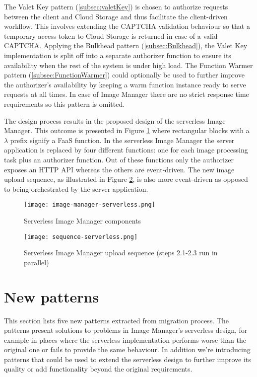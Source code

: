 The Valet Key pattern (\ref{subsec:valetKey}) is chosen to authorize requests between the client and Cloud Storage and thus facilitate the client-driven workflow. This involves extending the CAPTCHA validation behaviour so that a temporary access token to Cloud Storage is returned in case of a valid CAPTCHA. Applying the Bulkhead pattern (\ref{subsec:Bulkhead}), the Valet Key implementation is split off into a separate authorizer function to ensure its availability when the rest of the system is under high load. The Function Warmer pattern (\ref{subsec:FunctionWarmer}) could optionally be used to further improve the authorizer's availability by keeping a warm function instance ready to serve requests at all times. In case of Image Manager there are no strict response time requirements so this pattern is omitted.

The design process results in the proposed design of the serverless Image Manager. This outcome is presented in Figure \ref{fig:serverlessArchitecture} where rectangular blocks with a $\lambda$ prefix signify a FaaS function. In the serverless Image Manager the server application is replaced by four different functions: one for each image processing task plus an authorizer function. Out of these functions only the authorizer exposes an HTTP API whereas the others are event-driven. The new image upload sequence, as illustrated in Figure \ref{fig:serverlessSequence}, is also more event-driven as opposed to being orchestrated by the server application.

\begin{figure}[H]
  \centering
  \texttt{[image: image-manager-serverless.png]}
  \caption{Serverless Image Manager components}
  \label{fig:serverlessArchitecture}
\end{figure}

\begin{figure}[H]
  \centering
  \texttt{[image: sequence-serverless.png]}
  \caption{Serverless Image Manager upload sequence (steps 2.1-2.3 run in parallel)}
  \label{fig:serverlessSequence}
\end{figure}

\section{New patterns} \label{sec:newPatterns}

This section lists five new patterns extracted from migration process. The patterns present solutions to problems in Image Manager's serverless design, for example in places where the serverless implementation performs worse than the original one or fails to provide the same behaviour. In addition we're introducing patterns that could be used to extend the serverless design to further improve its quality or add functionality beyond the original requirements.

